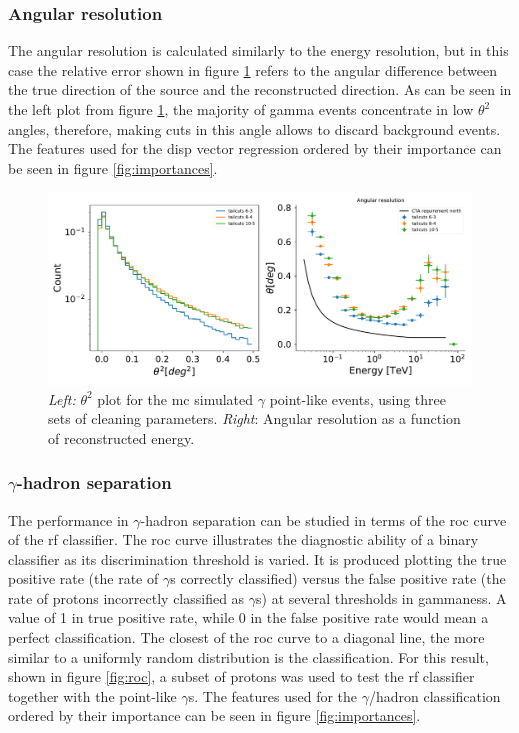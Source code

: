 \documentclass[main.tex]{subfiles}
\begin{document}
\subsubsection{Angular resolution}

The angular resolution is calculated similarly to the energy resolution, but in this case the relative error shown in figure \ref{fig:angres} refers to the angular difference between the true direction of the source and the reconstructed direction. As can be seen in the left plot from figure \ref{fig:angres}, the majority of gamma events concentrate in low $\theta^2$ angles, therefore, making cuts in this angle allows to discard background events. The features used for the disp vector regression ordered by their importance can be seen in figure \ref{fig:importances}.


\begin{figure}[h]
  \centering
  \includegraphics[width=1\textwidth]{Pictures/angular_resolution.pdf}
  \caption{\textit{Left:} $\theta^2$ plot for the \gls{mc} simulated $\gamma$ point-like events, using three sets of cleaning parameters. \textit{Right}: Angular resolution as a function of reconstructed energy.}
  \label{fig:angres}
\end{figure}

\subsubsection{$\gamma$-hadron separation}

The performance in $\gamma$-hadron separation can be studied in terms of the \gls{roc} curve of the \gls{rf} classifier. The \gls{roc} curve illustrates the diagnostic ability of a binary classifier as its discrimination threshold is varied. It is produced plotting the true positive rate (the rate of $\gamma$s correctly classified) versus the false positive rate (the rate of protons incorrectly classified as $\gamma$s) at several thresholds in gammaness. A value of 1 in true positive rate, while 0 in the false positive rate would mean a perfect classification. The closest of the \gls{roc} curve to a diagonal line, the more similar to a uniformly random distribution is the classification. For this result, shown in figure \ref{fig:roc}, a subset of protons was used to test the \gls{rf} classifier together with the point-like $\gamma$s. The features used for the $\gamma$/hadron classification ordered by their importance can be seen in figure \ref{fig:importances}.
\end{document}
